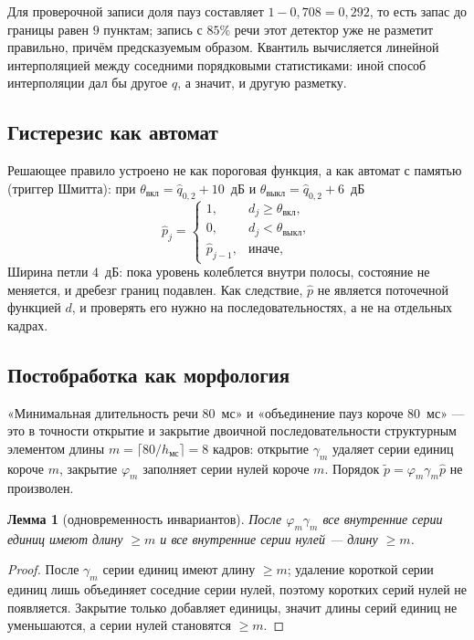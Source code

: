 \documentclass[11pt,a4paper]{article}
\theoremstyle{definition}
\theoremstyle{plain}
\newtheorem{lem}{Лемма}[section]
\begin{document}
Для проверочной записи доля пауз составляет $1-0{,}708=0{,}292$, то есть запас до
границы равен $9$ пунктам; запись с $85\%$ речи этот детектор уже не разметит
правильно, причём предсказуемым образом. Квантиль вычисляется линейной
интерполяцией между соседними порядковыми статистиками: иной способ
интерполяции дал бы другое $\hat q$, а значит, и другую разметку.

\subsection{Гистерезис как автомат}

Решающее правило устроено не как пороговая функция, а как автомат с памятью
(триггер Шмитта): при $\theta_{\text{вкл}}=\hat q_{0{,}2}+10$~дБ и
$\theta_{\text{выкл}}=\hat q_{0{,}2}+6$~дБ
\begin{equation}\label{eq:schmitt}
\hat p_j=
\begin{cases}
1, & d_j\ge\theta_{\text{вкл}},\\
0, & d_j<\theta_{\text{выкл}},\\
\hat p_{j-1}, & \text{иначе,}
\end{cases}
\end{equation}
Ширина петли $4$~дБ: пока уровень колеблется внутри полосы, состояние не
меняется, и дребезг границ подавлен. Как следствие, $\hat p$ не является
поточечной функцией $d$, и проверять его нужно на последовательностях, а не
на отдельных кадрах.

\subsection{Постобработка как морфология}

«Минимальная длительность речи $80$~мс» и «объединение пауз короче $80$~мс»
--- это в точности открытие и закрытие двоичной последовательности
структурным элементом длины $m=\lceil 80/h_{\text{мс}}\rceil=8$ кадров:
открытие $\gamma_m$ удаляет серии единиц короче $m$, закрытие $\varphi_m$
заполняет серии нулей короче $m$. Порядок $\tilde p=\varphi_m\gamma_m\hat p$
не произволен.

\begin{lem}[одновременность инвариантов]\label{lem:morphology}
После $\varphi_m\gamma_m$ все внутренние серии единиц имеют длину $\ge m$ и
все внутренние серии нулей --- длину $\ge m$.
\end{lem}
\begin{proof}
После $\gamma_m$ серии единиц имеют длину $\ge m$; удаление короткой серии
единиц лишь объединяет соседние серии нулей, поэтому коротких серий нулей не
появляется. Закрытие только добавляет единицы, значит длины серий единиц не
уменьшаются, а серии нулей становятся $\ge m$.
\end{proof}
\end{document}
